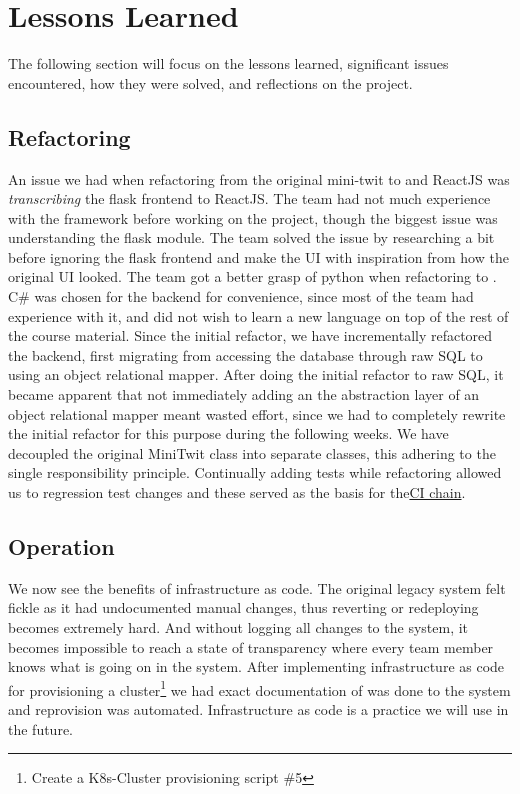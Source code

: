 \section{Lessons Learned}
\label{sec:lessons_learned}
The following section will focus on the lessons learned, significant issues encountered, how they were solved, and reflections on the project.
\subsection{Refactoring}
An issue we had when refactoring from the original mini-twit to \cs and ReactJS was \textit{transcribing} the flask frontend to ReactJS. The team had not much experience with the framework before working on the project, though the biggest issue was understanding the flask module. The team solved the issue by researching a bit before ignoring the flask frontend and make the UI with inspiration from how the original UI looked. The team got a better grasp of python when refactoring to \cs.
C\# was chosen for the backend for convenience, since most of the team had experience with it, and did not wish to learn a new language on top of the rest of the course material.
Since the initial refactor, we have incrementally refactored the backend, first migrating from accessing the database through raw SQL to using an object relational mapper. After doing the initial refactor to raw SQL, it became apparent that not immediately adding an the abstraction layer of an object relational mapper meant wasted effort, since we had to completely rewrite the initial refactor for this purpose during the following weeks.
We have decoupled the original MiniTwit class into separate classes, this adhering to the single responsibility principle. Continually adding tests while refactoring allowed us to regression test changes and these served as the basis for the\hyperref[subsubsec:ci]{CI chain}.


\subsection{Operation}
We now see the benefits of infrastructure as code. The original legacy system felt fickle as it had undocumented manual changes, thus reverting or redeploying becomes extremely hard. And without logging all changes to the system, it becomes impossible to reach a state of transparency where every team member knows what is going on in the system. After implementing infrastructure as code for provisioning a cluster\footnote{Create a K8s-Cluster provisioning script \#5\cite{opsIssue5}} we had exact documentation of was done to the system and reprovision was automated. Infrastructure as code is a practice we will use in the future.
